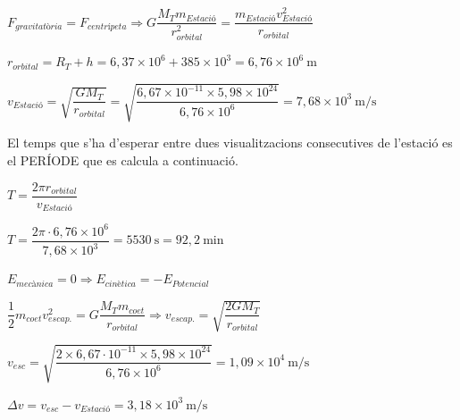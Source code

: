 \begin{solapartat}
 $F_{\textit{gravitatòria}} = F_{\textit{centrípeta}} \Rightarrow G\dfrac{M_T m_{\textit{Estació}}}{r_{orbital}^2} = \dfrac{m_{\textit{Estació}} v_{\textit{Estació}}^2}{r_{orbital}}$

 $r_{orbital} = R_T + h = 6,37\times 10^{6} + 385\times 10^{3} = 6,76\times 10^{6}\ \mathrm{m}$

 $v_{\textit{Estació}} = \sqrt{\dfrac{GM_T}{r_{orbital}}} = \sqrt{\dfrac{6,67\times 10^{-11}\times 5,98\times 10^{24}}{6,76\times 10^{6}}} = 7,68\times 10^{3}\ \mathrm{m/s}$

El temps que s'ha d'esperar entre dues visualitzacions consecutives de l'estació es el PERÍODE  que es calcula a continuació.

 $T = \dfrac{2\pi r_{orbital}}{v_{\textit{Estació}}}$

 $T = \dfrac{2\pi\cdot 6,76\times 10^{6}}{7,68\times 10^{3}} = 5530\ \mathrm{s} = 92,2\ \mathrm{min}$
\end{solapartat}

\begin{solapartat}
 $E_{\textit{mecànica}} = 0 \Rightarrow E_{\textit{cinètica}} = -E_{Potencial}$

 $\dfrac{1}{2}m_{coet}v_{escap.}^2 = G\dfrac{M_T m_{coet}}{r_{orbital}} \Rightarrow v_{escap.} = \sqrt{\dfrac{2GM_T}{r_{orbital}}}$

 $v_{esc} = \sqrt{\dfrac{2\times 6,67\cdot 10^{-11}\times 5,98\times 10^{24}}{6,76\times 10^{6}}} = 1,09\times 10^{4}\ \mathrm{m/s}$

 $\Delta v = v_{esc} - v_{\textit{Estació}} = 3,18\times 10^{3}\ \mathrm{m/s}$
\end{solapartat}
